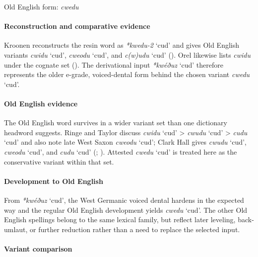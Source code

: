 \documentclass[
  british,
  a4paper,
]{article}
\providecommand{\Recon}[1]{\emph{*#1}}
\begin{document}
Old English form: \emph{cwedu}

\paragraph{Reconstruction and comparative
evidence}\label{reconstruction-and-comparative-evidence-78}

Kroonen reconstructs the resin word as \Recon{kwedu-2} `cud' and gives
Old English variants {\emph{cwidu}} `cud', {\emph{cweodu}} `cud', and
{\emph{c(w)udu}} `cud' ().
Orel likewise lists {\emph{cwidu}} under the cognate set
(). The derivational input
\Recon{kwéðuz} `cud' therefore represents the older e-grade,
voiced-dental form behind the chosen variant {\emph{cwedu}} `cud'.

\paragraph{Old English evidence}\label{old-english-evidence-78}

The Old English word survives in a wider variant set than one dictionary
headword suggests. Ringe and Taylor discuss {\emph{cwidu}} `cud'
\textgreater{} {\emph{cwudu}} `cud' \textgreater{} {\emph{cudu}} `cud'
and also note late West Saxon {\emph{cweodu}} `cud'; Clark Hall gives
{\emph{cwudu}} `cud', {\emph{cweodu}} `cud', and {\emph{cudu}} `cud'
(;
). Attested
\emph{cwedu} `cud' is treated here as the conservative variant within
that set.

\paragraph{Development to Old
English}\label{development-to-old-english-78}

From \Recon{kwéðuz} `cud', the West Germanic voiced dental hardens in
the expected way and the regular Old English development yields
{\emph{cwedu}} `cud'. The other Old English spellings belong to the same
lexical family, but reflect later leveling, back-umlaut, or further
reduction rather than a need to replace the selected input.

\paragraph{Variant comparison}\label{variant-comparison}
\end{document}
